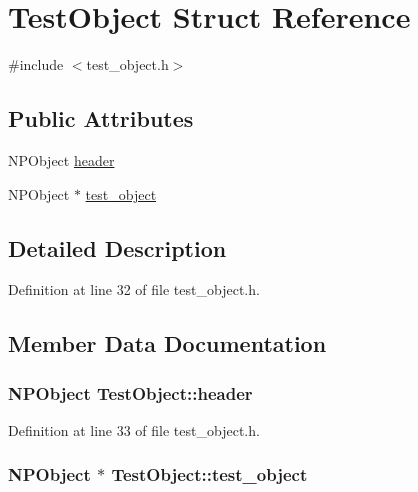 \hypertarget{struct_test_object}{
\section{TestObject Struct Reference}
\label{struct_test_object}
}


{\ttfamily \#include $<$test\_\-object.h$>$}

\subsection*{Public Attributes}
\begin{DoxyCompactItemize}
\item 
NPObject \hyperlink{struct_test_object_a23d7a50afe1b29f85b5d663cbfc763b2}{header}
\item 
NPObject $\ast$ \hyperlink{struct_test_object_a375c492938a3abf12d768b8578549861}{test\_\-object}
\end{DoxyCompactItemize}


\subsection{Detailed Description}


Definition at line 32 of file test\_\-object.h.



\subsection{Member Data Documentation}
\hypertarget{struct_test_object_a23d7a50afe1b29f85b5d663cbfc763b2}{
\subsubsection[{header}]{\setlength{\rightskip}{0pt plus 5cm}NPObject {\bf TestObject::header}}}
\label{struct_test_object_a23d7a50afe1b29f85b5d663cbfc763b2}


Definition at line 33 of file test\_\-object.h.

\hypertarget{struct_test_object_a375c492938a3abf12d768b8578549861}{
\subsubsection[{test\_\-object}]{\setlength{\rightskip}{0pt plus 5cm}NPObject $\ast$ {\bf TestObject::test\_\-object}}}
\label{struct_test_object_a375c492938a3abf12d768b8578549861}


